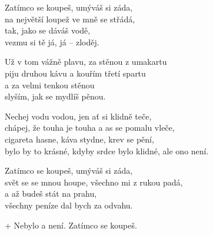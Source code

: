 
\ve{}
Zatímco se koupeš, umýváš si záda,\\
na největší loupež ve mně se střádá,\\
tak, jako se dáváš vodě,\\
vezmu si tě já, já -- zloděj.

\ve{}
Už v tom vážně plavu, za stěnou z umakartu\\
piju druhou kávu a kouřím třetí spartu\\
a za velmi tenkou stěnou\\
slyším, jak se mydlíš pěnou.

\cho{}
Nechej vodu vodou, jen ať si klidně teče,\\
chápej, že touha je touha a as se pomalu vleče,\\
cigareta hasne, káva stydne, krev se pění,\\
bylo by to krásné, kdyby srdce bylo klidné, ale ono není.

\ve{}
Zatímco se koupeš, umýváš si záda,\\
svět se se mnou houpe, všechno mi z rukou padá,\\
a až budeš stát na prahu,\\
všechny peníze dal bych za odvahu.

\cho{}
+ Nebylo a není. Zatímco se koupeš.

\esong